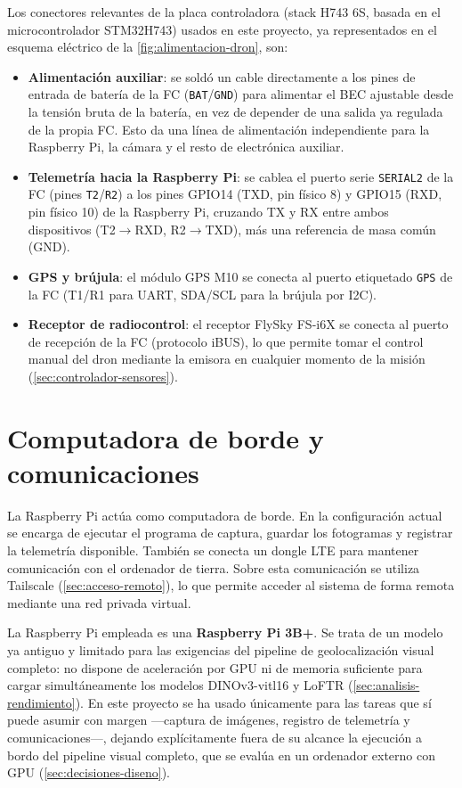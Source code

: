 Los conectores relevantes de la placa controladora (stack H743 6S, basada en el microcontrolador STM32H743) usados en este proyecto, ya representados en el esquema eléctrico de la \autoref{fig:alimentacion-dron}, son:

\begin{itemize}
\item \textbf{Alimentación auxiliar}: se soldó un cable directamente a los pines de entrada de batería de la FC (\texttt{BAT}/\texttt{GND}) para alimentar el BEC ajustable desde la tensión bruta de la batería, en vez de depender de una salida ya regulada de la propia FC. Esto da una línea de alimentación independiente para la Raspberry Pi, la cámara y el resto de electrónica auxiliar.
\item \textbf{Telemetría hacia la Raspberry Pi}: se cablea el puerto serie \texttt{SERIAL2} de la FC (pines \texttt{T2}/\texttt{R2}) a los pines GPIO14 (TXD, pin físico 8) y GPIO15 (RXD, pin físico 10) de la Raspberry Pi, cruzando TX y RX entre ambos dispositivos (T2$\to$RXD, R2$\to$TXD), más una referencia de masa común (GND).
\item \textbf{GPS y brújula}: el módulo GPS M10 se conecta al puerto etiquetado \texttt{GPS} de la FC (T1/R1 para UART, SDA/SCL para la brújula por I2C).
\item \textbf{Receptor de radiocontrol}: el receptor FlySky FS-i6X se conecta al puerto de recepción de la FC (protocolo iBUS), lo que permite tomar el control manual del dron mediante la emisora en cualquier momento de la misión (\autoref{sec:controlador-sensores}).
\end{itemize}

\section{Computadora de borde y comunicaciones}
\label{sec:hardware-raspberry-comunicaciones}

La Raspberry Pi actúa como computadora de borde. En la configuración actual se encarga de ejecutar el programa de captura, guardar los fotogramas y registrar la telemetría disponible. También se conecta un dongle LTE para mantener comunicación con el ordenador de tierra. Sobre esta comunicación se utiliza Tailscale (\autoref{sec:acceso-remoto}), lo que permite acceder al sistema de forma remota mediante una red privada virtual.

La Raspberry Pi empleada es una \textbf{Raspberry Pi 3B+}. Se trata de un modelo ya antiguo y limitado para las exigencias del pipeline de geolocalización visual completo: no dispone de aceleración por GPU ni de memoria suficiente para cargar simultáneamente los modelos DINOv3-vitl16 y LoFTR (\autoref{sec:analisis-rendimiento}). En este proyecto se ha usado únicamente para las tareas que sí puede asumir con margen —captura de imágenes, registro de telemetría y comunicaciones—, dejando explícitamente fuera de su alcance la ejecución a bordo del pipeline visual completo, que se evalúa en un ordenador externo con GPU (\autoref{sec:decisiones-diseno}).


